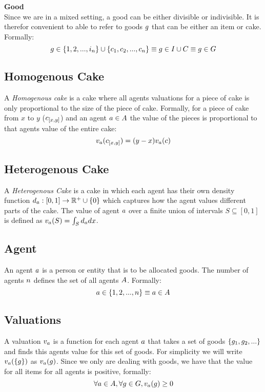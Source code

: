 \textbf{Good}\\
Since we are in a mixed setting, a good can be either divisible or indivisible. It is therefor convenient to able to refer to goods $g$ that can be either an item or cake. Formally:
$$g\in\{1,2,...,i_n\}\cup\{c_1, c_2, ...,c_n\}\equiv g\in I\cup C\equiv g\in G$$



\subsection*{Homogenous Cake}\label{subsec:homogenous-cake}
A \emph{Homogenous cake} is a cake where all agents valuations for a piece of cake is only proportional to the size of the piece of cake. Formally, for a piece of cake from $x$ to $y$ ($c_{[x,y]}$) and an agent $a\in A$ the value of the pieces is proportional to that agents value of the entire cake:
$$v_a(c_{[x,y]})=(y-x)v_a(c)$$



\subsection*{Heterogenous Cake}
A \emph{Heterogenous Cake} is a cake in which each agent has their own density function $d_a:[0,1]\rightarrow\mathbb{R}^+\cup\{0\}$ which captures how the agent values different parts of the cake. The value of agent $a$ over a finite union of intervals $S \subseteq [0, 1]$ is defined as $v_a(S) = \int_S d_a dx$.



\subsection*{Agent}
An agent $a$ is a person or entity that is to be allocated goods. The number of agents $n$ defines the set of all agents $A$. Formally:
$$a\in\{1,2,...,n\}\equiv a\in A$$



\subsection*{Valuations}
A valuation $v_a$ is a function for each agent $a$ that takes a set of goods $\{g_1, g_2,...\}$ and finds this agents value for this set of goods. For simplicity we will write $v_a(\{g\})$ as $v_a(g)$. Since we only are dealing with goods, we have that the value for all items for all agents is positive, formally:
$$\forall a\in A, \forall g\in G, v_a(g)\geq0$$



